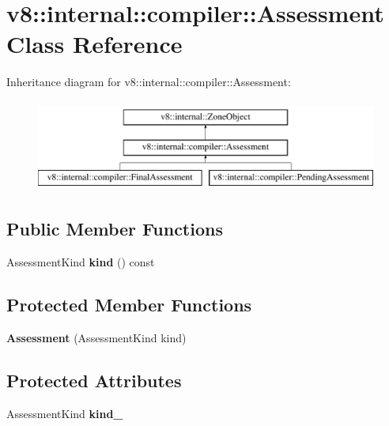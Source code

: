 \hypertarget{classv8_1_1internal_1_1compiler_1_1Assessment}{}\section{v8\+:\+:internal\+:\+:compiler\+:\+:Assessment Class Reference}
\label{classv8_1_1internal_1_1compiler_1_1Assessment}
Inheritance diagram for v8\+:\+:internal\+:\+:compiler\+:\+:Assessment\+:\begin{figure}[H]
\begin{center}
\leavevmode
\includegraphics[height=3.000000cm]{classv8_1_1internal_1_1compiler_1_1Assessment}
\end{center}
\end{figure}
\subsection*{Public Member Functions}
\begin{DoxyCompactItemize}
\item 
\mbox{\label{classv8_1_1internal_1_1compiler_1_1Assessment_af59af59c5462cb1be7d15a981a231c03}} 
Assessment\+Kind {\bfseries kind} () const
\end{DoxyCompactItemize}
\subsection*{Protected Member Functions}
\begin{DoxyCompactItemize}
\item 
\mbox{\label{classv8_1_1internal_1_1compiler_1_1Assessment_a8bedfc7bec0f2f77dfcab9bd98d232bf}} 
{\bfseries Assessment} (Assessment\+Kind kind)
\end{DoxyCompactItemize}
\subsection*{Protected Attributes}
\begin{DoxyCompactItemize}
\item 
\mbox{\label{classv8_1_1internal_1_1compiler_1_1Assessment_a59a845038607ebb84ef021b985e67920}} 
Assessment\+Kind {\bfseries kind\+\_\+}
\end{DoxyCompactItemize}


